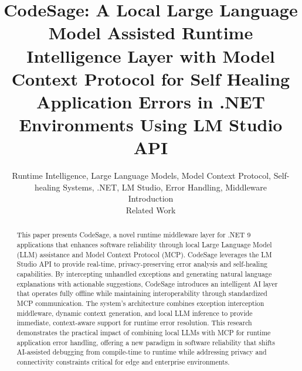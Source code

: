 \documentclass[conference]{IEEEtran}
\begin{document}
\title{CodeSage: A Local Large Language Model Assisted Runtime Intelligence Layer with Model Context Protocol for Self Healing Application Errors in .NET Environments Using LM Studio API}

\author{

\maketitle

\begin{abstract}
This paper presents CodeSage, a novel runtime middleware layer for .NET 9 applications that enhances software reliability through local Large Language Model (LLM) assistance and Model Context Protocol (MCP). CodeSage leverages the LM Studio API to provide real-time, privacy-preserving error analysis and self-healing capabilities. By intercepting unhandled exceptions and generating natural language explanations with actionable suggestions, CodeSage introduces an intelligent AI layer that operates fully offline while maintaining interoperability through standardized MCP communication. The system's architecture combines exception interception middleware, dynamic context generation, and local LLM inference to provide immediate, context-aware support for runtime error resolution. This research demonstrates the practical impact of combining local LLMs with MCP for runtime application error handling, offering a new paradigm in software reliability that shifts AI-assisted debugging from compile-time to runtime while addressing privacy and connectivity constraints critical for edge and enterprise environments.
\end{abstract}

\begin{IEEEkeywords}
Runtime Intelligence, Large Language Models, Model Context Protocol, Self-healing Systems, .NET, LM Studio, Error Handling, Middleware
\end{IEEEkeywords}

\section{Introduction}


\section{Related Work}


}
\end{document}
